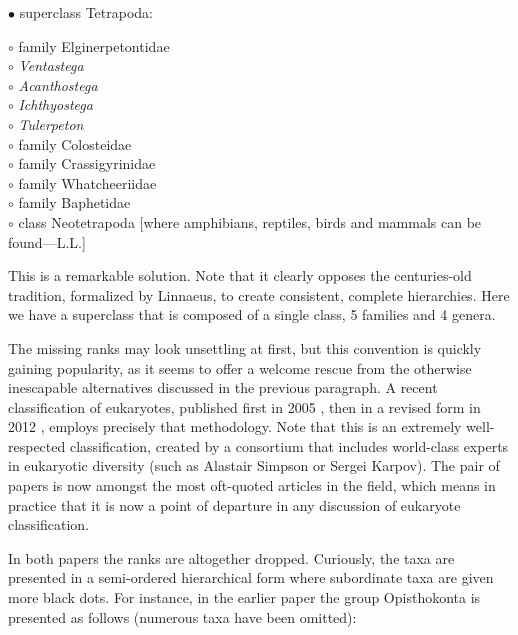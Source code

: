 \begin{artengenv}
\pagebreak%
\noindent$\bullet$ superclass Tetrapoda:
\begin{addmargin}[1em]{0em}
 $\circ$ family Elginerpetontidae\\
 $\circ$ \textit{Ventastega}\\
 $\circ$ \textit{Acanthostega}\\
 $\circ$ \textit{Ichthyostega}\\
 $\circ$ \textit{Tulerpeton}\\
 $\circ$ family Colosteidae\\
 $\circ$ family Crassigyrinidae\\
 $\circ$ family Whatcheeriidae\\
 $\circ$ family Baphetidae\\
 $\circ$ class Neotetrapoda [where amphibians, reptiles, birds and mammals can be found---L.L.]
\end{addmargin}

\smallskip

This is a remarkable solution. Note that it clearly opposes the centuries-old tradition, formalized by Linnaeus, to
create consistent, complete hierarchies. Here we have a superclass that is composed of a single class, 5 families and 4
genera.

The missing ranks may look unsettling at first, but this convention is quickly gaining popularity, as it seems to offer
a welcome rescue from the otherwise inescapable alternatives discussed in the previous paragraph. A recent
classification of eukaryotes, published first in 2005
\parencite{adl_new_2005},
then in a revised
form in 2012
\parencite{adl_revised_2012},
employs precisely that methodology. Note that this is an
extremely well-respected classification, created by a consortium that includes world-class experts in eukaryotic
diversity (such as Alastair Simpson or Sergei Karpov). The pair of papers is now amongst the most oft-quoted articles
in the field, which means in practice that it is now a point of departure in any discussion of eukaryote
classification.

In both papers the ranks are altogether dropped. Curiously, the taxa are presented in a semi-ordered hierarchical form
where subordinate taxa are given more black dots. For instance, in the earlier paper
\parencite{adl_new_2005}
the group Opisthokonta is presented as follows (numerous taxa have been omitted):


\end{artengenv}
